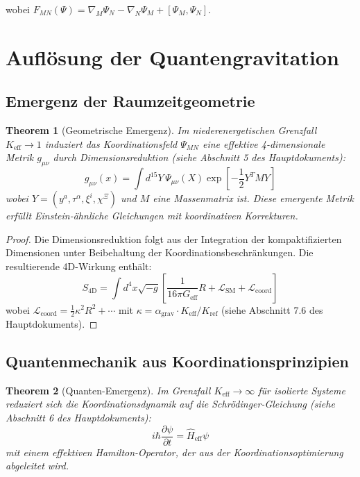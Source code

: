 \documentclass[12pt,a4paper]{article}
\newcommand{\eff}{\text{eff}}
\newcommand{\coord}{\text{coord}}
\newtheorem{theorem}{Theorem}[section]
\theoremstyle{remark}
\newcommand{\Keff}{K_{\mathrm{eff}}}
\begin{document}
	wobei $F_{MN}(\Psi) = \nabla_M \Psi_N - \nabla_N \Psi_M + [\Psi_M, \Psi_N]$.
	
	\section{Auflösung der Quantengravitation}
	\label{sec:quantum-gravity-resolution}
	
	\subsection{Emergenz der Raumzeitgeometrie}
	
	\begin{theorem}[Geometrische Emergenz]
		Im niederenergetischen Grenzfall $\Keff \to 1$ induziert das Koordinationsfeld $\Psi_{MN}$ eine effektive 4-dimensionale Metrik $g_{\mu\nu}$ durch Dimensionsreduktion (siehe Abschnitt 5 des Hauptdokuments):
		\[
		g_{\mu\nu}(x) = \int d^{15}Y \, \Psi_{\mu\nu}(X) \exp\left[-\frac{1}{2}Y^T M Y\right]
		\]
		wobei $Y = (y^a, \tau^\alpha, \xi^i, \chi^\Xi)$ und $M$ eine Massenmatrix ist. Diese emergente Metrik erfüllt Einstein-ähnliche Gleichungen mit koordinativen Korrekturen.
	\end{theorem}
	
	\begin{proof}
		Die Dimensionsreduktion folgt aus der Integration der kompaktifizierten Dimensionen unter Beibehaltung der Koordinationsbeschränkungen. Die resultierende 4D-Wirkung enthält:
		\[
		S_{\text{4D}} = \int d^4x \sqrt{-g} \left[ \frac{1}{16\pi G_{\eff}} R + \mathcal{L}_{\text{SM}} + \mathcal{L}_{\coord} \right]
		\]
		wobei $\mathcal{L}_{\coord} = \frac{1}{2}\kappa^2 R^2 + \cdots$ mit $\kappa = \alpha_{\text{grav}} \cdot \Keff/K_{\text{ref}}$ (siehe Abschnitt 7.6 des Hauptdokuments).
	\end{proof}
	
	\subsection{Quantenmechanik aus Koordinationsprinzipien}
	
	\begin{theorem}[Quanten-Emergenz]
		Im Grenzfall $\Keff \to \infty$ für isolierte Systeme reduziert sich die Koordinationsdynamik auf die Schrödinger-Gleichung (siehe Abschnitt 6 des Hauptdokuments):
		\[
		i\hbar \frac{\partial \psi}{\partial t} = \hat{H}_{\eff} \psi
		\]
		mit einem effektiven Hamilton-Operator, der aus der Koordinationsoptimierung abgeleitet wird.
	\end{theorem}
	
\end{document}

